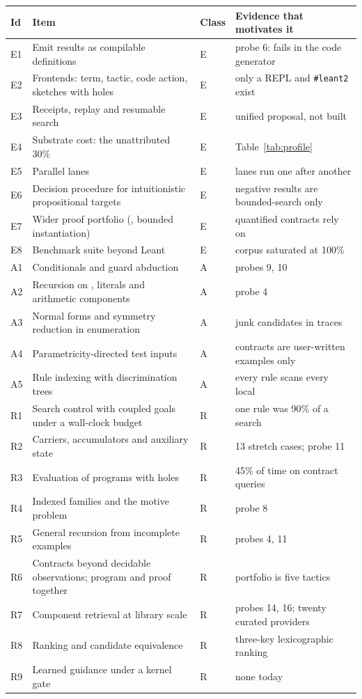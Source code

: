 \begingroup\small
\begin{longtable}{@{}L{12mm}L{67mm}L{10mm}L{57mm}@{}}
\toprule
Id & Item & Class & Evidence that motivates it\\
\midrule
\endhead
E1 & Emit results as compilable definitions & E & probe 6:  fails in the code generator\\
E2 & Frontends: term, tactic, code action, sketches with holes & E & only a REPL and \texttt{\#leant2} exist\\
E3 & Receipts, replay and resumable search & E & unified proposal, not built\\
E4 & Substrate cost: the unattributed 30\% & E & Table~\ref{tab:profile}\\
E5 & Parallel lanes & E & lanes run one after another\\
E6 & Decision procedure for intuitionistic propositional targets & E & negative results are bounded-search only\\
E7 & Wider proof portfolio (, bounded instantiation) & E & quantified contracts rely on \\
E8 & Benchmark suite beyond Leant & E & corpus saturated at 100\%\\
\midrule
A1 & Conditionals and guard abduction & A & probes 9, 10\\
A2 & Recursion on , literals and arithmetic components & A & probe 4\\
A3 & Normal forms and symmetry reduction in enumeration & A & junk candidates in traces\\
A4 & Parametricity-directed test inputs & A & contracts are user-written examples only\\
A5 & Rule indexing with discrimination trees & A & every rule scans every local\\
\midrule
R1 & Search control with coupled goals under a wall-clock budget & R & one rule was 90\% of a search\\
R2 & Carriers, accumulators and auxiliary state & R & 13 stretch cases; probe 11\\
R3 & Evaluation of programs with holes & R & 45\% of time on contract queries\\
R4 & Indexed families and the motive problem & R & probe 8\\
R5 & General recursion from incomplete examples & R & probes 4, 11\\
R6 & Contracts beyond decidable observations; program and proof together & R & portfolio is five tactics\\
R7 & Component retrieval at library scale & R & probes 14, 16; twenty curated providers\\
R8 & Ranking and candidate equivalence & R & three-key lexicographic ranking\\
R9 & Learned guidance under a kernel gate & R & none today\\
\bottomrule
\end{longtable}
\endgroup

